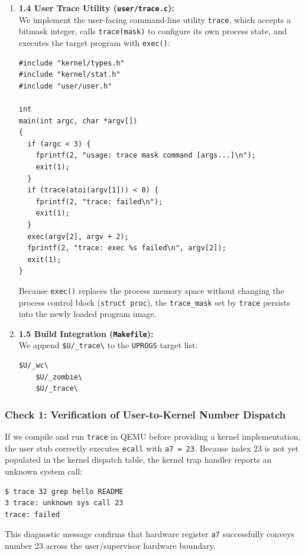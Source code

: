 \documentclass{labreport}
\begin{document}
\begin{enumerate}[leftmargin=*]
    \item \textbf{1.4 User Trace Utility (\texttt{user/trace.c}):}\\
    We implement the user-facing command-line utility \texttt{trace}, which accepts a bitmask integer, calls \texttt{trace(mask)} to configure its own process state, and executes the target program with \texttt{exec()}:
\begin{lstlisting}[style=c]
#include "kernel/types.h"
#include "kernel/stat.h"
#include "user/user.h"

int
main(int argc, char *argv[])
{
  if (argc < 3) {
    fprintf(2, "usage: trace mask command [args...]\n");
    exit(1);
  }
  if (trace(atoi(argv[1])) < 0) {
    fprintf(2, "trace: failed\n");
    exit(1);
  }
  exec(argv[2], argv + 2);
  fprintf(2, "trace: exec %s failed\n", argv[2]);
  exit(1);
}
\end{lstlisting}
    Because \texttt{exec()} replaces the process memory space without changing the process control block (\texttt{struct proc}), the \texttt{trace\_mask} set by \texttt{trace} persists into the newly loaded program image.

    \item \textbf{1.5 Build Integration (\texttt{Makefile}):}\\
    We append \texttt{\$U/\_trace\textbackslash} to the \texttt{UPROGS} target list:
\begin{lstlisting}[style=bash]
	$U/_wc\
	$U/_zombie\
	$U/_trace\
\end{lstlisting}
\end{enumerate}

\subsubsection{Check 1: Verification of User-to-Kernel Number Dispatch}
If we compile and run \texttt{trace} in QEMU before providing a kernel implementation, the user stub correctly executes \texttt{ecall} with \texttt{a7 = 23}. Because index 23 is not yet populated in the kernel dispatch table, the kernel trap handler reports an unknown system call:
\begin{lstlisting}[style=bash]
$ trace 32 grep hello README
3 trace: unknown sys call 23
trace: failed
\end{lstlisting}
This diagnostic message confirms that hardware register \texttt{a7} successfully conveys number 23 across the user/supervisor hardware boundary.

\end{document}
